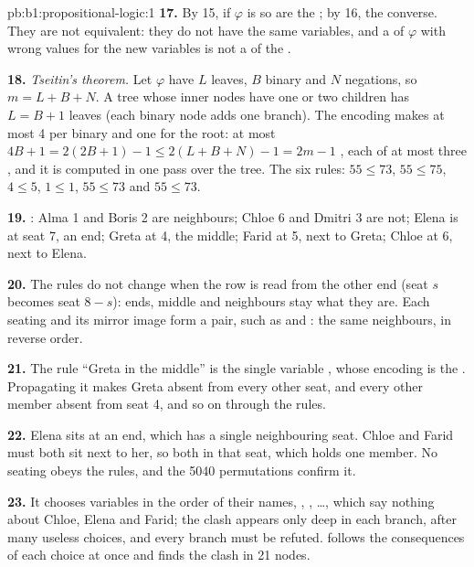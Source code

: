 \begin{solution}{pb:b1:propositional-logic:1}
\textbf{17.} By 15, if $\varphi$ is  so are the ; by 16, the converse. They are not equivalent: they do
not have the same variables, and a  of $\varphi$ with wrong values for the new variables is not a  of the
.

\textbf{18.} \emph{Tseitin's theorem.} Let $\varphi$ have $L$ leaves, $B$ binary  and $N$ negations, so $m =
L + B + N$. A tree whose inner nodes have one or two children has $L = B + 1$ leaves (each binary node adds one
branch). The encoding makes at most 4  per binary  and one for the root: at most $4B + 1 = 2(2B + 1)
- 1 \leq 2(L + B + N) - 1 = 2m - 1$ , each of at most three , and it is computed in one pass over the
tree. The six rules: $55 \leq 73$, $55 \leq 75$, $4 \leq 5$, $1 \leq 1$, $55 \leq 73$ and $55 \leq 73$.

\textbf{19.} : Alma 1 and Boris 2 are neighbours; Chloe 6 and Dmitri 3 are not; Elena is at seat 7, an
end; Greta at 4, the middle; Farid at 5, next to Greta; Chloe at 6, next to Elena.

\textbf{20.} The rules do not change when the row is read from the other end (seat $s$ becomes seat $8 - s$): ends,
middle and neighbours stay what they are. Each seating and its mirror image form a pair, such as  and
: the same neighbours, in reverse order.

\textbf{21.} The rule ``Greta in the middle'' is the single variable , whose encoding is the 
. Propagating it makes Greta absent from every other seat, and every other member absent from seat 4, and so
on through the rules.

\textbf{22.} Elena sits at an end, which has a single neighbouring seat. Chloe and Farid must both sit next to her, so
both in that seat, which holds one member. No seating obeys the rules, and the 5040 permutations confirm it.

\textbf{23.} It chooses variables in the order of their names, , , \dots, which say nothing about
Chloe, Elena and Farid; the clash appears only deep in each branch, after many useless choices, and every branch must
be refuted.  follows the consequences of each choice at once and finds the clash in 21 nodes.


\end{solution}
